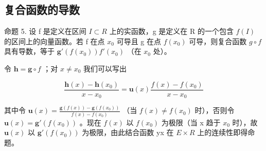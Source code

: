 \subsection{复合函数的导数}

命题 5. 设 f 是定义在区间 \(I \subset R\) 上的实函数，g 是定义在 R 的一个包含 \(f(I)\) 的区间上的向量函数。若 f 在点 \(x_{0}\) 可导且 g 在点 \(f(x_{0})\) 可导，则复合函数 \(g \circ f\) 具有导数，等于 \(\mathbf{g}'(f(x_{0}))f'(x_{0})\) （在 \(x_{0}\) 处）。

令 \(\mathbf{h} = \mathbf{g} \circ f\) ；对 \(x \neq x_0\) 我们可以写出

\[
\frac {\mathbf {h} (x) - \mathbf {h} (x _ {0})}{x - x _ {0}} = \mathbf {u} (x) \frac {f (x) - f (x _ {0})}{x - x _ {0}}
\]

其中令 \(\mathbf{u}(x)=\frac{\mathbf{g}(f(x))-\mathbf{g}(f(x_{0}))}{f(x)-f(x_{0})}\) （当 \(f(x)\neq f(x_{0})\) 时），否则令 \(\mathbf{u}(x)=\mathbf{g}'(f(x_{0}))\) 。现在 \(f(x)\) 以 \(f(x_{0})\) 为极限（当 x 趋于 \(x_{0}\) 时），故 \(\mathbf{u}(x)\) 以 \(\mathbf{g}'(f(x_{0}))\) 为极限，由此结合函数 yx 在 \(E\times R\) 上的连续性即得命题。

